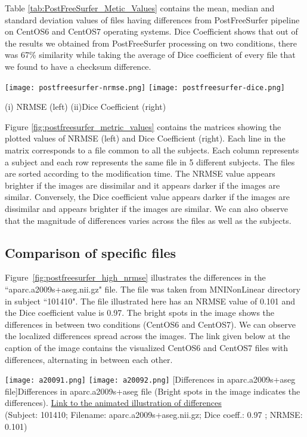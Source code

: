 Table \ref{tab:PostFreeSurfer_Metic_Values} contains the mean, median and standard deviation values of files having differences from PostFreeSurfer pipeline on CentOS6 and CentOS7 operating systems. Dice Coefficient shows that out of the results we obtained from PostFreeSurfer processing on two conditions, there was 67\% similarity while taking the average of Dice coefficient of every file that we found to have a checksum difference.

\begin{center}
\texttt{[image: postfreesurfer-nrmse.png]}%
\texttt{[image: postfreesurfer-dice.png]}
\caption*{(i) NRMSE (left) (ii)Dice Coefficient (right)}
\label{fig:postfreesurfer_metric_values}
\end{center}

Figure \ref{fig:postfreesurfer_metric_values} contains the matrices showing the plotted values of NRMSE (left) and Dice Coefficient (right). Each line in the matrix corresponds to a file common to all the subjects. Each column represents a subject and each row represents the same file in 5 different subjects. The files are sorted according to the modification time. The NRMSE value appears brighter if the images are dissimilar and it appears darker if the images are similar. Conversely, the Dice coefficient value appears darker if the images are dissimilar and appears brighter if the images are similar. We can also observe that the magnitude of differences varies across the files as well as the subjects.

\subsection{Comparison of specific files}
Figure~\ref{fig:postfreesurfer_high_nrmse} illustrates the differences in the ``aparc.a2009s+aseg.nii.gz" file. The file was taken from MNINonLinear directory in subject ``101410". The file illustrated here has an NRMSE value of 0.101 and the Dice coefficient value is 0.97. The bright spots in the image shows the differences in between two conditions (CentOS6 and CentOS7). We can observe the localized differences spread across the images. The link given below at the caption of the image contains the visualized CentOS6 and CentOS7 files with differences, alternating in between each other.

\begin{center}
\texttt{[image: a20091.png]}%
\texttt{[image: a20092.png]}
  [Differences in aparc.a2009s+aseg file]{Differences in aparc.a2009s+aseg file (Bright spots in the image indicates the differences). \href{https://drive.google.com/file/d/1eeofWaPyk-A2pQd6LlieQwbMYVOrfeI3/view?usp=sharing}{Link to the animated illustration of differences}\\(Subject: 101410; Filename: aparc.a2009s+aseg.nii.gz; Dice coeff.: 0.97 ; NRMSE: 0.101)}
\label{fig:postfreesurfer_high_nrmse}
\end{center}

